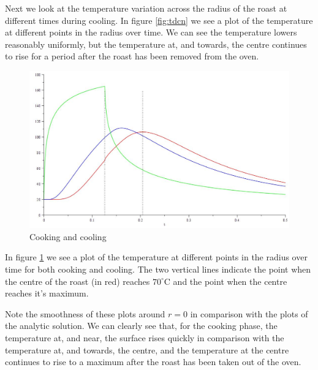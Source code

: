 \documentclass{report}
\begin{document}
Next we look at the temperature variation across the radius of the roast at different times during cooling. In figure 
\ref{fig:tdcn} we see a plot of the temperature at different points in the radius over time. We can see the temperature 
lowers reasonably uniformly, but the temperature at, and towards, the centre continues to rise for a period after the 
roast has been removed from the oven.\bigskip

\begin{figure}[h]
\centering
\includegraphics[scale = 0.15]{cooking-and-cooling-numeric}
\caption{Cooking and cooling}
\label{fig:cacn}
\end{figure}

In figure \ref{fig:cacn} we see a plot of the temperature at different points in the radius over time for both cooking 
and cooling. The two vertical lines indicate the point when the centre of the roast (in red) reaches $70^{\circ}\mathrm{C}$ 
and the point when the centre reaches it's maximum.\bigskip

Note the smoothness of these plots around $r = 0$ in comparison with the plots of the analytic solution. We can clearly see 
that, for the cooking phase, the temperature at, and near, the surface rises quickly in comparison with the temperature at, 
and towards, the centre, and the temperature at the centre continues to rise to a maximum after the roast has been taken 
out of the oven.\bigskip
\end{document}
